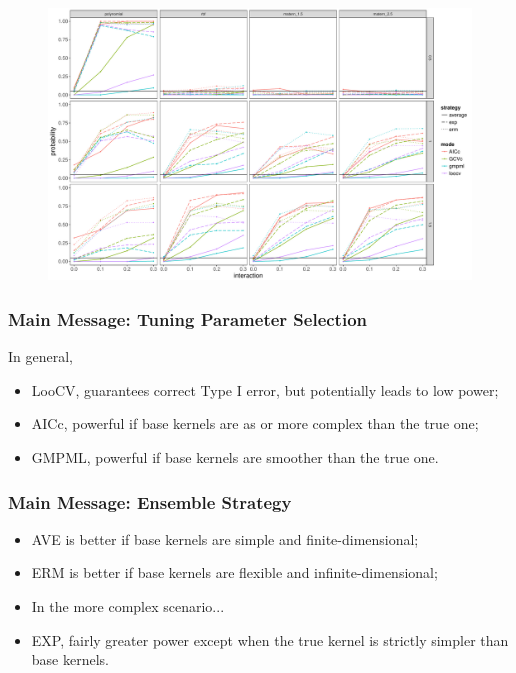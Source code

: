 \documentclass{beamer}
\begin{document}
\begin{frame}
\label{mat_rbf}
\begin{figure}
\centering
\includegraphics[width=\linewidth]{"./plot/mat_rbf"}
\end{figure}
\end{frame}

\begin{frame}
\frametitle{Main Message: Tuning Parameter Selection}
In general, 
\begin{itemize}
\item LooCV, guarantees correct Type I error, but potentially leads to low power; \hyperlink{mat_rbf}{}
\item AICc, powerful if base kernels are as or more complex than the true one; \hyperlink{mat_rbf}{}
\item GMPML, powerful if base kernels are smoother than the true one. \hyperlink{poly}{}
\end{itemize}
\end{frame}


\begin{frame}
\frametitle{Main Message: Ensemble Strategy}
\begin{itemize}
\item AVE is better if base kernels are simple and finite-dimensional; \hyperlink{poly}{}
\item ERM is better if base kernels are flexible and infinite-dimensional; \hyperlink{rbf}{} \hyperlink{mat_rbf}{}
\item In the more complex scenario... \hyperlink{poly_rbf}{}
\item EXP, fairly greater power except when the true kernel is strictly simpler than base kernels. \hyperlink{rbf}{}
\end{itemize}
\end{frame}
\end{document}
